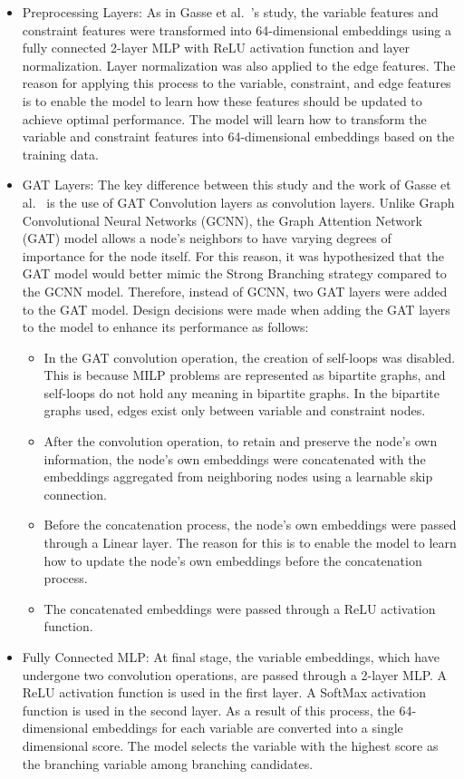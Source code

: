 \begin{itemize}
  \item Preprocessing Layers: As in Gasse et al.~\cite{gasseExactCombinatorialOptimization2019}'s study, the variable features and constraint features were transformed into 64-dimensional embeddings using a fully connected 2-layer MLP with ReLU activation function and layer normalization.
  Layer normalization was also applied to the edge features.
  The reason for applying this process to the variable, constraint, and edge features is to enable the model to learn how these features should be updated to achieve optimal performance.
  The model will learn how to transform the variable and constraint features into 64-dimensional embeddings based on the training data.
  \item GAT Layers: The key difference between this study and the work of Gasse et al.~\cite{gasseExactCombinatorialOptimization2019} is the use of GAT Convolution layers as convolution layers.
  Unlike Graph Convolutional Neural Networks (GCNN), the Graph Attention Network (GAT) model allows a node's neighbors to have varying degrees of importance for the node itself.
  For this reason, it was hypothesized that the GAT model would better mimic the Strong Branching strategy compared to the GCNN model.
  Therefore, instead of GCNN, two GAT layers were added to the GAT model.
  Design decisions were made when adding the GAT layers to the model to enhance its performance as follows:
  \begin{itemize}
      \item In the GAT convolution operation, the creation of self-loops was disabled.
      This is because MILP problems are represented as bipartite graphs, and self-loops do not hold any meaning in bipartite graphs.
      In the bipartite graphs used, edges exist only between variable and constraint nodes.
      \item After the convolution operation, to retain and preserve the node's own information, the node's own embeddings were concatenated with the embeddings aggregated from neighboring nodes using a learnable skip connection.
      \item Before the concatenation process, the node's own embeddings were passed through a Linear layer.
      The reason for this is to enable the model to learn how to update the node's own embeddings before the concatenation process.
      \item The concatenated embeddings were passed through a ReLU activation function.
  \end{itemize}
  \item Fully Connected MLP: At final stage, the variable embeddings, which have undergone two convolution operations, are passed through a 2-layer MLP.
  A ReLU activation function is used in the first layer.
  A SoftMax activation function is used in the second layer.
  As a result of this process, the 64-dimensional embeddings for each variable are converted into a single dimensional score.
  The model selects the variable with the highest score as the branching variable among branching candidates.
\end{itemize}


